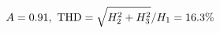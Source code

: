 \documentclass[preview]{standalone}
\begin{document}
\begin{align*}
\special{dvisvgm:raw <g id='unique000'>}A=0.91,\ \text{THD}=\sqrt{H_2^2+H_3^2}/H_1=16.3\%\special{dvisvgm:raw </g>}
\end{align*}
\end{document}
